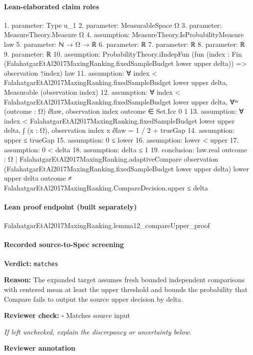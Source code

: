 \documentclass[10pt]{article}
\newcommand{\reviewerbox}{%
  \par\noindent\fbox{\parbox{0.96\linewidth}{\rule{0pt}{0.38in}}}\par
}
\newcommand{\reviewmatch}[1]{%
  \par\noindent\textbf{Reviewer check:} $\square$\; #1\par
  \noindent\emph{If left unchecked, explain the discrepancy or uncertainty below.}\par
}
\begin{document}
\paragraph{Lean-elaborated claim roles}\begin{ReviewVerbatim}
1. parameter: Type u_1
2. parameter: MeasurableSpace Ω
3. parameter: MeasureTheory.Measure Ω
4. assumption: MeasureTheory.IsProbabilityMeasure law
5. parameter: ℕ → Ω → ℝ
6. parameter: ℝ
7. parameter: ℝ
8. parameter: ℝ
9. parameter: ℝ
10. assumption: ProbabilityTheory.iIndepFun
  (fun (index : Fin (FalahatgarEtAl2017MaxingRanking.fixedSampleBudget lower upper delta)) => observation ↑index) law
11. assumption: ∀ index < FalahatgarEtAl2017MaxingRanking.fixedSampleBudget lower upper delta, Measurable (observation index)
12. assumption: ∀ index < FalahatgarEtAl2017MaxingRanking.fixedSampleBudget lower upper delta,
  ∀ᵐ (outcome : Ω) ∂law, observation index outcome ∈ Set.Icc 0 1
13. assumption: ∀ index < FalahatgarEtAl2017MaxingRanking.fixedSampleBudget lower upper delta,
  ∫ (x : Ω), observation index x ∂law = 1 / 2 + trueGap
14. assumption: upper ≤ trueGap
15. assumption: 0 ≤ lower
16. assumption: lower < upper
17. assumption: 0 < delta
18. assumption: delta ≤ 1
19. conclusion: law.real
    {outcome : Ω |
      FalahatgarEtAl2017MaxingRanking.adaptiveCompare observation
          (FalahatgarEtAl2017MaxingRanking.fixedSampleBudget lower upper delta) lower upper delta outcome ≠
        FalahatgarEtAl2017MaxingRanking.CompareDecision.upper} ≤
  delta
\end{ReviewVerbatim}

\paragraph{Lean proof endpoint (built separately)}\begin{ReviewVerbatim}
FalahatgarEtAl2017MaxingRanking.lemma12_compareUpper_proof
\end{ReviewVerbatim}

\paragraph{Recorded source-to-Spec screening}
\textbf{Verdict:} \texttt{matches}
\\
{\raggedright
\textbf{Reason:} The expanded target assumes fresh bounded independent comparisons with centered mean at least the upper threshold and bounds the probability that Compare fails to output the source upper decision by delta.\allowbreak{}
\par}
\reviewmatch{Matches source input}
\noindent\textbf{Reviewer annotation}\par
\reviewerbox
\clearpage
\hypertarget{source-claim-fd70b9f9c339b2ba}{}
\end{document}
